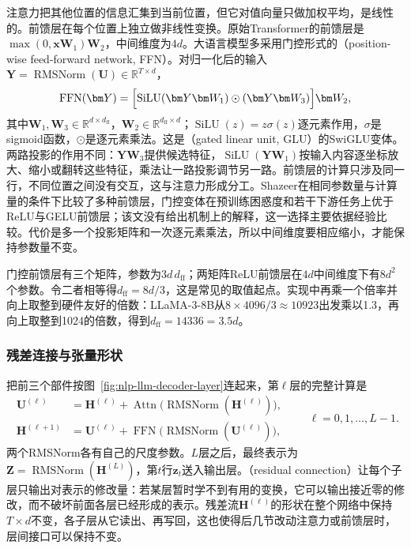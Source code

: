 注意力把其他位置的信息汇集到当前位置，但它对值向量只做加权平均，是线性的。前馈层在每个位置上独立做非线性变换。原始Transformer的前馈层是$\max(0,\bm x\bm W_1)\bm W_2$，中间维度为$4d$。大语言模型多采用门控形式的（position-wise feed-forward network, FFN）。对归一化后的输入$\bm Y=\operatorname{RMSNorm}(\bm U)\in\mathbb R^{T\times d}$，
\begin{equation}
  \operatorname{FFN}(\bm Y)=\Bigl[\operatorname{SiLU}(\bm Y\bm W_1)\odot(\bm Y\bm W_3)\Bigr]\bm W_2,
  \label{eq:nlp-llm-ffn}
\end{equation}
其中$\bm W_1,\bm W_3\in\mathbb R^{d\times d_{\mathrm{ff}}}$，$\bm W_2\in\mathbb R^{d_{\mathrm{ff}}\times d}$；$\operatorname{SiLU}(z)=z\sigma(z)$逐元素作用，$\sigma$是sigmoid函数，$\odot$是逐元素乘法。这是（gated linear unit, GLU）的SwiGLU变体。两路投影的作用不同：$\bm Y\bm W_3$提供候选特征，$\operatorname{SiLU}(\bm Y\bm W_1)$按输入内容逐坐标放大、缩小或翻转这些特征，乘法让一路投影调节另一路。前馈层的计算只涉及同一行，不同位置之间没有交互，这与注意力形成分工。Shazeer在相同参数量与计算量的条件下比较了多种前馈层，门控变体在预训练困惑度和若干下游任务上优于ReLU与GELU前馈层；该文没有给出机制上的解释，这一选择主要依据经验比较。代价是多一个投影矩阵和一次逐元素乘法，所以中间维度要相应缩小，才能保持参数量不变。

门控前馈层有三个矩阵，参数为$3d\,d_{\mathrm{ff}}$；两矩阵ReLU前馈层在$4d$中间维度下有$8d^2$个参数。令二者相等得$d_{\mathrm{ff}}=8d/3$，这是常见的取值起点。实现中再乘一个倍率并向上取整到硬件友好的倍数：LLaMA-3-8B从$8\times4096/3\approx10923$出发乘以1.3，再向上取整到1024的倍数，得到$d_{\mathrm{ff}}=14336=3.5d$。

\subsubsection{残差连接与张量形状}
\label{sec:nlp-llm-residual-shapes}

把前三个部件按图~\ref{fig:nlp-llm-decoder-layer}连起来，第$\ell$层的完整计算是
\begin{equation}
  \begin{aligned}
    \bm U^{(\ell)}&=\bm H^{(\ell)}+\operatorname{Attn}\bigl(\operatorname{RMSNorm}(\bm H^{(\ell)})\bigr),\\
    \bm H^{(\ell+1)}&=\bm U^{(\ell)}+\operatorname{FFN}\bigl(\operatorname{RMSNorm}(\bm U^{(\ell)})\bigr),
  \end{aligned}
  \qquad \ell=0,1,\ldots,L-1.
  \label{eq:nlp-llm-decoder-layer}
\end{equation}
两个RMSNorm各有自己的尺度参数。$L$层之后，最终表示为$\bm Z=\operatorname{RMSNorm}(\bm H^{(L)})$，第$t$行$\bm z_t$送入输出层。（residual connection）让每个子层只输出对表示的修改量：若某层暂时学不到有用的变换，它可以输出接近零的修改，而不破坏前面各层已经形成的表示。残差流$\bm H^{(\ell)}$的形状在整个网络中保持$T\times d$不变，各子层从它读出、再写回，这也使得后几节改动注意力或前馈层时，层间接口可以保持不变。

